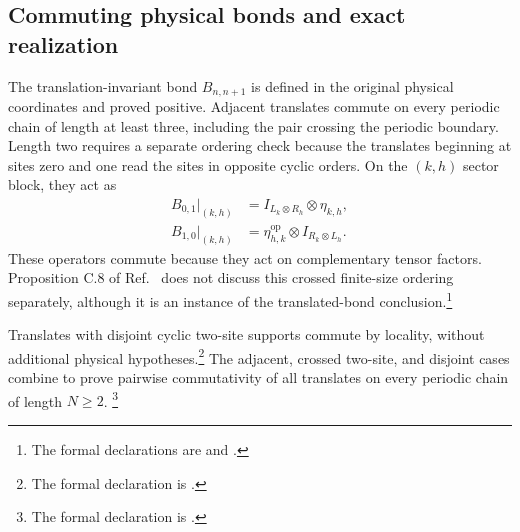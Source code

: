 \documentclass{article}
\begin{document}
\subsection{Commuting physical bonds and exact realization}

The translation-invariant bond $B_{n,n+1}$ is defined in the original physical
coordinates and proved positive. Adjacent translates commute on every
periodic chain of length at least three, including the pair crossing the
periodic boundary. Length two requires a separate ordering check because the
translates beginning at sites zero and one read the sites in opposite cyclic
orders. On the $(k,h)$ sector block, they act as
\begin{align}
    B_{0,1}\big|_{(k,h)}
        &=
        I_{L_k\otimes R_h}\otimes\eta_{k,h},
    \label{eq:cpgsv17_mpdo_sal_zcl_eta_local_structure_two_site_forward_bond}\\
    B_{1,0}\big|_{(k,h)}
        &=
        \eta_{h,k}^{\mathrm{op}}
        \otimes I_{R_k\otimes L_h}.
    \label{eq:cpgsv17_mpdo_sal_zcl_eta_local_structure_two_site_reverse_bond}
\end{align}
These operators commute because they act on complementary tensor factors.
Proposition C.8 of Ref.~\cite{Cirac2016MPDO_arXiv} does not discuss this
crossed finite-size ordering separately, although it is an instance of the
translated-bond conclusion.\footnote{The formal declarations are
 and
.}

Translates with disjoint cyclic two-site supports commute by locality, without
additional physical hypotheses.\footnote{The formal declaration is
.}
The adjacent, crossed two-site, and disjoint cases combine to prove pairwise
commutativity of all translates on every periodic chain of length $N\geq 2$.
\footnote{The formal declaration is
.}
\end{document}
